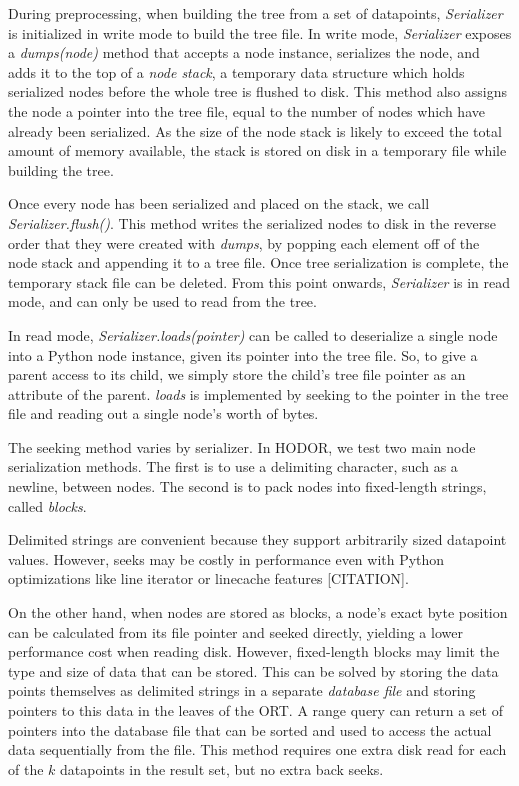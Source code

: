 \documentclass[11pt, oneside]{article}
\newcommand{\ms}{\textit}
\begin{document}
During preprocessing, when building the tree from a set of datapoints,
\ms{Serializer} is initialized in write mode to build the tree file. In write
mode, \ms{Serializer} exposes a \ms{dumps(node)} method that accepts a
node instance, serializes the node, and adds it to the top of a \textit{node stack},
a temporary data structure which holds serialized nodes before the whole tree is
flushed to disk. This method also assigns the node a pointer into the tree file,
equal to the number of nodes which have already been serialized. As the size of
the node stack is likely to exceed the total amount of memory available, the
stack is stored on disk in a temporary file while building the tree. 

Once every node has been serialized and placed on the stack, we call
\ms{Serializer.flush()}. This method writes the serialized nodes to disk in the
reverse order that they were created with \ms{dumps}, by popping each element
off of the node stack and appending it to a tree file. Once tree serialization
is complete, the temporary stack file can be deleted. From this point onwards,
\ms{Serializer} is in read mode, and can only be used to read from the tree.

In read mode, \ms{Serializer.loads(pointer)} can be called to deserialize a
single node into a Python node instance, given its pointer into the tree file.
So, to give a parent access to its child, we simply store the child's tree file
pointer as an attribute of the parent. \ms{loads} is implemented by seeking to
the pointer in the tree file and reading out a single node's worth of bytes.

The seeking method varies by serializer. In HODOR, we test two main node
serialization methods. The first is to use a delimiting character, such as a
newline, between nodes. The second is to pack nodes into fixed-length strings,
called \textit{blocks}. 

Delimited strings are convenient because they support
arbitrarily sized datapoint values. However, seeks may be costly in performance
even with Python optimizations like line iterator or linecache features
[CITATION]. 

On the other hand, when nodes are stored as blocks, a node's exact byte
position can be calculated from its file pointer and seeked directly, yielding
a lower performance cost when reading disk. However, fixed-length blocks may
limit the type and size of data that can be stored. This can be solved by
storing the data points themselves as delimited strings in a separate
\textit{database file} and storing pointers to this data in the leaves of the
ORT. A range query can return a set of pointers into the database file that can
be sorted and used to access the actual data sequentially from the file. This
method requires one extra disk read for each of the $k$ datapoints in the
result set, but no extra back seeks.
\end{document}
